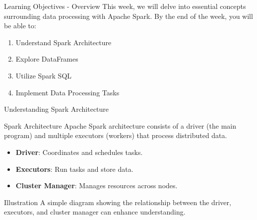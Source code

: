 \documentclass[aspectratio=169]{beamer}
\begin{document}
\begin{frame}[fragile]{Learning Objectives - Overview}
    This week, we will delve into essential concepts surrounding data processing with Apache Spark. By the end of the week, you will be able to:
    \begin{enumerate}
        \item Understand Spark Architecture
        \item Explore DataFrames
        \item Utilize Spark SQL
        \item Implement Data Processing Tasks
    \end{enumerate}
\end{frame}

\begin{frame}[fragile]{Understanding Spark Architecture}
    \begin{block}{Spark Architecture}
        Apache Spark architecture consists of a driver (the main program) and multiple executors (workers) that process distributed data.
    \end{block}
    
    \begin{itemize}
        \item \textbf{Driver}: Coordinates and schedules tasks.
        \item \textbf{Executors}: Run tasks and store data.
        \item \textbf{Cluster Manager}: Manages resources across nodes.
    \end{itemize}
    
    \begin{block}{Illustration}
        A simple diagram showing the relationship between the driver, executors, and cluster manager can enhance understanding.
    \end{block}
\end{frame}
\end{document}
